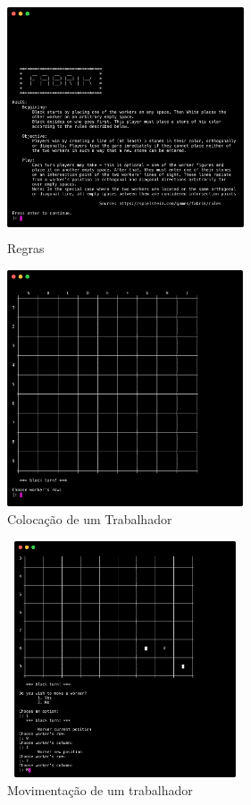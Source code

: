 \documentclass[a4paper]{article}
\begin{document}
\begin{figure}[h!]
\begin{center}
\includegraphics[height=7cm,width=7cm]{images/fabrik_rules.png}
\caption{Regras}
\label{Figura 1}
\end{center}
\end{figure}

\begin{figure}[h!]
\begin{center}
\includegraphics[height=7cm,width=7cm]{images/fabrik_choose_worker.png}
\caption{Colocação de um Trabalhador}
\label{Figura 1}
\end{center}
\end{figure}

\begin{figure}[h!]
\begin{center}
\includegraphics[height=7cm,width=7cm]{images/fabrik_change_worker_pos.png}
\caption{Movimentação de um trabalhador}
\label{Figura 1}
\end{center}
\end{figure}
\end{document}

